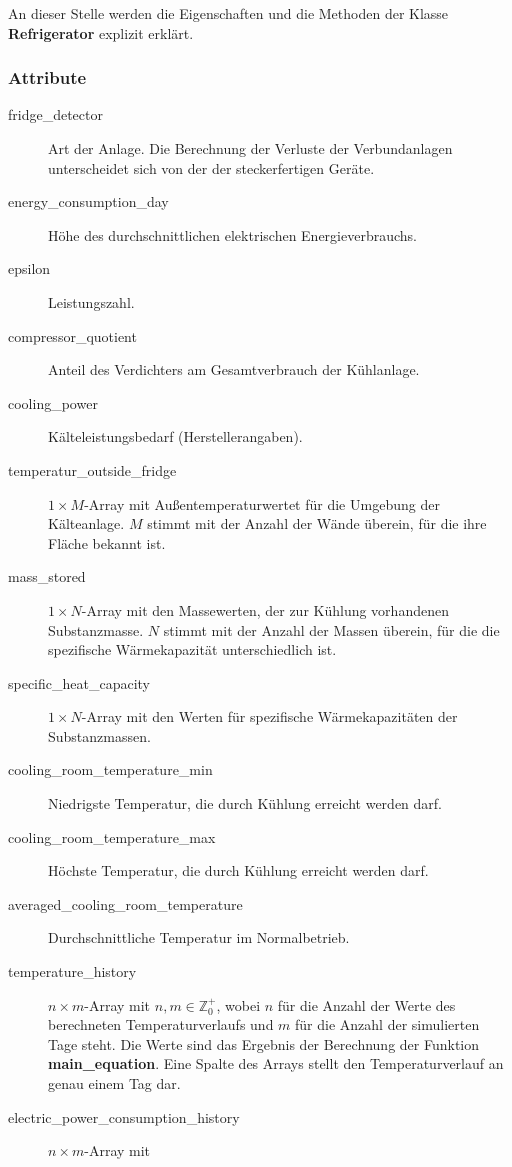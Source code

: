 An dieser Stelle werden die Eigenschaften und die Methoden der Klasse
\textbf{Refrigerator} explizit erkl\"art.

\subsubsection*{Attribute}
\begin{description}
	\item[fridge\_detector] Art der Anlage. Die Berechnung der Verluste der
	Verbundanlagen unterscheidet sich von der der steckerfertigen
	Ger\"ate.
	\item[energy\_consumption\_day] H\"ohe des durchschnittlichen
	elektrischen Energieverbrauchs.
	\item[epsilon] Leistungszahl.
	\item[compressor\_quotient] Anteil des Verdichters am Gesamtverbrauch
	der K\"uhlanlage.
	\item[cooling\_power] K\"alteleistungsbedarf (Herstellerangaben).
	\item[temperatur\_outside\_fridge] $1\times M$-Array mit
	Au\ss entemperaturwertet f\"ur die Umgebung der K\"alteanlage. $M$
	stimmt mit der Anzahl der W\"ande \"uberein, f\"ur die ihre Fl\"ache
	bekannt ist.
	\item[mass\_stored] $1\times N$-Array mit den Massewerten, der zur
	K\"uhlung vorhandenen Substanzmasse. $N$ stimmt mit der Anzahl der
	Massen \"uberein, f\"ur die die spezifische W\"armekapazit\"at
	unterschiedlich ist.
	\item[specific\_heat\_capacity] $1\times N$-Array mit den Werten f\"ur
	spezifische W\"armekapazit\"aten der Substanzmassen.
	\item[cooling\_room\_temperature\_min] Niedrigste Temperatur, die durch
	K\"uhlung erreicht werden darf.
	\item[cooling\_room\_temperature\_max] H\"ochste Temperatur, die durch
	K\"uhlung erreicht werden darf.
	\item[averaged\_cooling\_room\_temperature] Durchschnittliche Temperatur
	im Normalbetrieb.
	\item[temperature\_history] $n \times m$-Array mit $n,m\in
	\mathbb{Z}^+_0$, wobei $n$ f\"ur die Anzahl der Werte des berechneten
	Temperaturverlaufs und $m$ f\"ur die Anzahl der simulierten Tage
	steht. Die Werte sind das Ergebnis der
	Berechnung der Funktion \textbf{main\_equation}. Eine Spalte des Arrays
	stellt den Temperaturverlauf an genau einem Tag dar.
	\item[electric\_power\_consumption\_history] $n \times m$-Array mit

\end{description}
